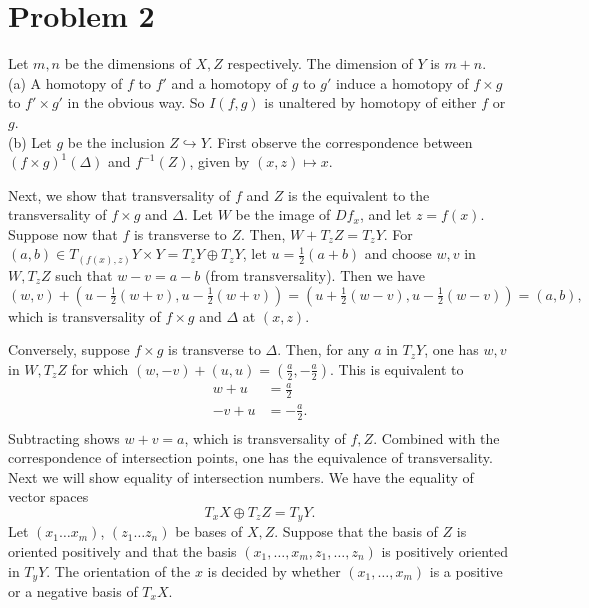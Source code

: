 \documentclass{amsart}
\numberwithin{equation}{section}
\theoremstyle{plain}
\theoremstyle{definition}
\theoremstyle{remark}
\renewcommand{\_}[2]{\underbrace{#1}_{#2}}
\renewcommand{\^}[2]{\overbrace{#1}_{#2}}
\begin{document}
\section*{Problem 2}
Let $m,n$ be the dimensions of $X,Z$ respectively. The dimension of $Y$ is $m+n$. \\

(a) A homotopy of $f$ to $f'$ and a homotopy of $g$ to $g'$ induce a homotopy of $f\times g$ to $f'\times g'$ in the obvious way. So $I(f,g)$ is unaltered by homotopy of either $f$ or $g$. \\

(b) Let $g$ be the inclusion $Z\hookrightarrow Y$. First observe the correspondence between $(f\times g)^{1}(\Delta)$ and $f^{-1}(Z)$, given by $(x,z) \mapsto x$.

Next, we show that transversality of $f$ and $Z$ is the equivalent to the transversality of $f\times g$ and $\Delta$. Let $W$ be the image of $Df_x$, and let $z = f(x)$. Suppose now that $f$ is transverse to $Z$. Then, $W + T_zZ = T_zY$. For $(a,b) \in T_{(f(x),z)}Y\times Y = T_zY \oplus T_zY$, let $u = \frac12 (a+b)$ and choose $w, v$ in $W, T_zZ$ such that $w-v = a-b$ (from transversality). Then we have \[(w,v) + (u-\tfrac12 (w+v), u -\tfrac12 (w+v)) = (u + \tfrac12 (w-v), u - \tfrac12 (w-v)) = (a,b),\] which is transversality of $f\times g$ and $\Delta$ at $(x,z)$.

Conversely, suppose $f\times g$ is transverse to $\Delta$. Then, for any $a$ in $T_zY$, one has $w, v$ in $W, T_zZ$ for which $(w,-v) + (u,u) = (\frac a2,-\frac a2)$. This is equivalent to
\begin{align*}
  w + u & = \frac a 2\\
  -v + u & = -\frac a 2.\\
\end{align*}
Subtracting shows $w+v = a$, which is transversality of $f,Z$. Combined with the correspondence of intersection points, one has the equivalence of transversality.\\

Next we will show equality of intersection numbers. We have the equality of vector spaces \[T_xX \oplus T_zZ = T_yY.\] Let $(x_1\dots x_m)$, $(z_1 \dots z_n)$ be bases of $X,Z$. Suppose that the basis of $Z$ is oriented positively and that the basis $(x_1, \dots, x_m, z_1, \dots ,z_n)$ is positively oriented in $T_yY$. The orientation of the $x$ is decided by whether $(x_1, \dots ,x_m)$ is a positive or a negative basis of $T_xX$. \\
\end{document}
